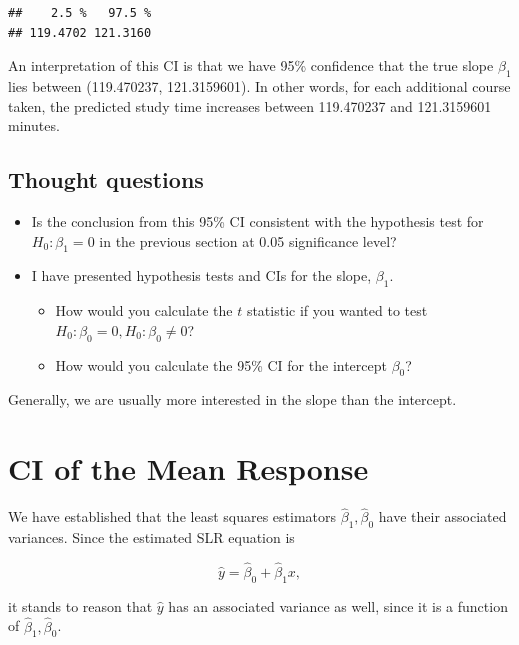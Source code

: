 \documentclass[
]{book}
\begin{document}
\begin{verbatim}
##    2.5 %   97.5 % 
## 119.4702 121.3160
\end{verbatim}

An interpretation of this CI is that we have 95\% confidence that the true slope \(\beta_1\) lies between (119.470237, 121.3159601). In other words, for each additional course taken, the predicted study time increases between 119.470237 and 121.3159601 minutes.

\hypertarget{thought-questions}{%
\subsection{Thought questions}\label{thought-questions}}

\begin{itemize}
\item
  Is the conclusion from this 95\% CI consistent with the hypothesis test for \(H_0: \beta_1 = 0\) in the previous section at 0.05 significance level?
\item
  I have presented hypothesis tests and CIs for the slope, \(\beta_1\).

  \begin{itemize}
  \item
    How would you calculate the \(t\) statistic if you wanted to test \(H_0: \beta_0 = 0, H_0: \beta_0 \neq 0\)?
  \item
    How would you calculate the 95\% CI for the intercept \(\beta_0\)?
  \end{itemize}
\end{itemize}

Generally, we are usually more interested in the slope than the intercept.

\hypertarget{ci-of-the-mean-response}{%
\section{CI of the Mean Response}\label{ci-of-the-mean-response}}

We have established that the least squares estimators \(\hat{\beta}_1,\hat{\beta}_0\) have their associated variances. Since the estimated SLR equation is

\begin{equation} 
\hat{y}=\hat{\beta}_0+\hat{\beta}_1 x,
\label{eq:4fitted}
\end{equation}

it stands to reason that \(\hat{y}\) has an associated variance as well, since it is a function of \(\hat{\beta}_1,\hat{\beta}_0\).
\end{document}
